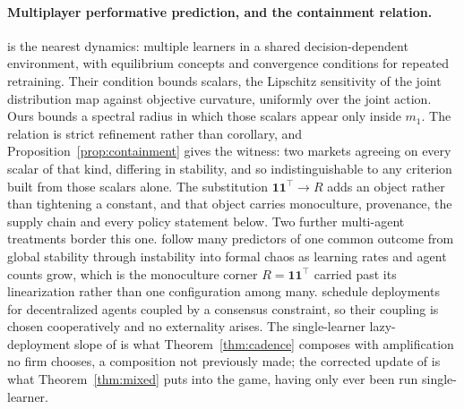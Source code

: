 \documentclass{article}
\theoremstyle{plain}
\theoremstyle{definition}
\begin{document}
\paragraph{Multiplayer performative prediction, and the containment relation.}
\citet{narang2023} is the nearest dynamics: multiple learners in a shared decision-dependent environment, with equilibrium concepts and convergence conditions for repeated retraining. Their condition bounds scalars, the Lipschitz sensitivity of the joint distribution map against objective curvature, uniformly over the joint action. Ours bounds a spectral radius in which those scalars appear only inside $m_1$. The relation is strict refinement rather than corollary, and Proposition~\ref{prop:containment} gives the witness: two markets agreeing on every scalar of that kind, differing in stability, and so indistinguishable to any criterion built from those scalars alone. The substitution $\mathbf{1}\mathbf{1}^{\top}\!\to R$ adds an object rather than tightening a constant, and that object carries monoculture, provenance, the supply chain and every policy statement below. Two further multi-agent treatments border this one. \citet{piliouras2023} follow many predictors of one common outcome from global stability through instability into formal chaos as learning rates and agent counts grow, which is the monoculture corner $R = \mathbf{1}\mathbf{1}^{\top}$ carried past its linearization rather than one configuration among many. \citet{li2022} schedule deployments for decentralized agents coupled by a consensus constraint, so their coupling is chosen cooperatively and no externality arises. The single-learner lazy-deployment slope of \citet{mendlerdunner2020} is what Theorem~\ref{thm:cadence} composes with amplification no firm chooses, a composition not previously made; the corrected update of \citet{izzo2021} is what Theorem~\ref{thm:mixed} puts into the game, having only ever been run single-learner.
\end{document}
